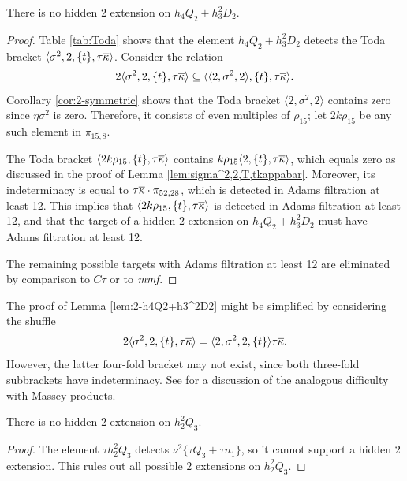 \begin{lemma}
\label{lem:2-h4Q2+h3^2D2}
There is no hidden $2$ extension on $h_4 Q_2 + h_3^2 D_2$.
\end{lemma}

\begin{proof}
Table \ref{tab:Toda} shows that the element
$h_4 Q_2 + h_3^2 D_2$ detects the Toda bracket
$\langle \sigma^2, 2, \{t\}, \tau \overline{\kappa} \rangle$.
Consider the relation
\[
2 \langle \sigma^2, 2, \{t\}, \tau \overline{\kappa} \rangle \subseteq
\langle \langle 2, \sigma^2, 2 \rangle, \{t\}, \tau \overline{\kappa} \rangle.
\]
Corollary \ref{cor:2-symmetric} shows 
that the Toda bracket $\langle 2, \sigma^2, 2 \rangle$ contains
zero since $\eta \sigma^2$ is zero.  Therefore, it
consists of even multiples of $\rho_{15}$;
let $2 k \rho_{15}$ be any such element in $\pi_{15,8}$.

The Toda bracket
$\langle 2 k \rho_{15}, \{t\}, \tau \overline{\kappa} \rangle$
contains $k \rho_{15} \langle 2, \{t\}, \tau \overline{\kappa} \rangle$,
which equals zero as discussed in the proof
of Lemma \ref{lem:sigma^2,2,T,tkappabar}.
Moreover, its indeterminacy
is equal to $\tau \overline{\kappa} \cdot \pi_{52,28}$,
which is detected in Adams filtration at least 12.
This implies that
$\langle 2 k \rho_{15}, \{t\}, \tau \overline{\kappa} \rangle$
is detected in Adams filtration at least 12,
and that
the target of a hidden $2$ extension on $h_4 Q_2 + h_3^2 D_2$
must have Adams filtration at least 12.

The remaining possible targets with Adams filtration at least 12
are eliminated by comparison to $C\tau$ or to $\textit{mmf}$.
\end{proof}

\begin{remark}
\label{rem:2-h4Q2+h3^2D2}
The proof of Lemma \ref{lem:2-h4Q2+h3^2D2} might be simplified by
considering the shuffle
\[
2 \langle \sigma^2, 2, \{t\}, \tau \overline{\kappa} \rangle =
\langle 2, \sigma^2, 2, \{t\} \rangle \tau \overline{\kappa}.
\]
However, the latter four-fold bracket may not exist, since
both three-fold subbrackets have indeterminacy.
See \cite{Isaksen14b} for a discussion of the analogous 
difficulty with Massey products.
\end{remark}

\begin{lemma}
\label{lem:2-h2^2Q3}
There is no hidden $2$ extension on $h_2^2 Q_3$.
\end{lemma}

\begin{proof}
The element $\tau h_2^2 Q_3$ detects
$\nu^2 \{\tau Q_3 + \tau n_1\}$, so it cannot support a 
hidden $2$ extension.
This rules out all possible $2$ extensions on
$h_2^2 Q_3$.
\end{proof}

